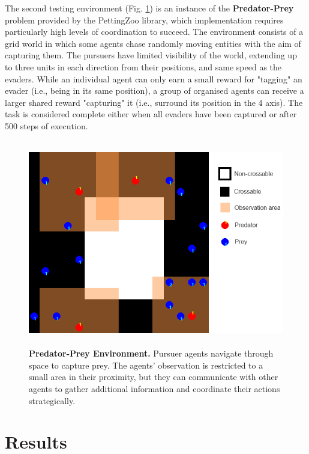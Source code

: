\documentclass[a4paper,singleside,12pt]{report} %
\begin{document}
The second testing environment (Fig. \ref{fig:pursuit}) is an instance of the \textbf{Predator-Prey} problem provided by the PettingZoo library, which implementation requires particularly high levels of coordination to succeed. The environment consists of a grid world in which some agents chase randomly moving entities with the aim of capturing them. The pursuers have limited visibility of the world, extending up to three units in each direction from their positions, and same speed as the evaders. While an individual agent can only earn a small reward for "tagging" an evader (i.e., being in its same position), a group of organised agents can receive a larger shared reward "capturing" it (i.e., surround its position in the 4 axis). The task is considered complete either when all evaders have been captured or after 500 steps of execution.

\begin{figure}
  \centering
  \includegraphics[height=9cm]{images/pursuit.png}
  \caption{\textbf{Predator-Prey Environment.} Pursuer agents navigate through space to capture prey. The agents' observation is restricted to a small area in their proximity, but they can communicate with other agents to gather additional information and coordinate their actions strategically.}
  \label{fig:pursuit}
\end{figure}


\section{Results}\label{results}
\end{document}
